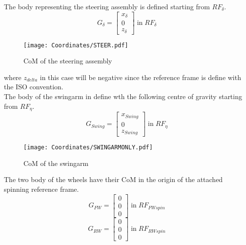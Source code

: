 %
The body representing the steering assembly is defined starting from $RF_\delta$.
%
\begin{equation}
    G_{\delta} =
    \left[
    \begin{array}{c}
        x_{\delta}\\
        0\\
        z_{\delta}
    \end{array}
    \right]
    \; \text{in} \; RF_{\delta}
\end{equation}
%
\begin{figure}[h!]
    \centering
    \texttt{[image: Coordinates/STEER.pdf]}
    \caption{CoM of the steering assembly}
    \label{fig:CoMdelta}
\end{figure}
%
where $z_{delta}$ in this case will be negative since the reference frame is define with the ISO convention.\\
The body of the swingarm in define wth the following centre of gravity starting from $RF_\eta$.
%
\begin{equation}
    G_{Swing} =
    \left[
    \begin{array}{c}
        x_{Swing}\\
        0\\
        z_{Swing}
    \end{array}
    \right]
    \; \text{in} \; RF_{\eta}
\end{equation}
%
\begin{figure}[h!]
    \centering
    \texttt{[image: Coordinates/SWINGARMONLY.pdf]}
    \caption{CoM of the swingarm}
    \label{fig:CoMswa}
\end{figure}
%
The two body of the wheels have their CoM in the origin of the attached spinning reference frame.
%
\begin{equation}
    G_{FW} =
    \left[
    \begin{array}{c}
        0\\
        0\\
        0
    \end{array}
    \right]
    \; \text{in} \; RF_{FWspin}
\end{equation}
%
\begin{equation}
    G_{RW} =
    \left[
    \begin{array}{c}
        0\\
        0\\
        0
    \end{array}
    \right]
    \; \text{in} \; RF_{RWspin}
\end{equation}
